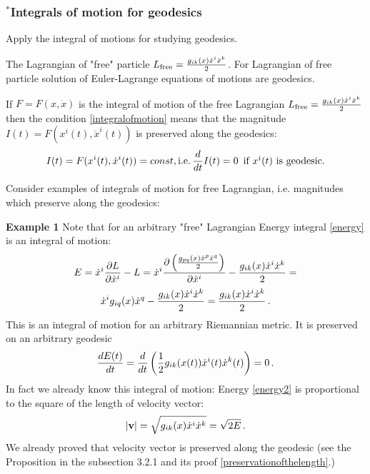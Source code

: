\documentclass[12pt]{article}
\theoremstyle{theorem}
\numberwithin{equation}{section}
\begin{document}
{\subsubsection {$^*$Integrals of motion for geodesics}

Apply the integral of motions for studying geodesics.

The Lagrangian of "free" particle  $L_{\rm free}={g_{ik}(x)\dot x^i\dot x^k\over 2}$.
  For Lagrangian of free particle solution of Euler-Lagrange equations of motions are geodesics.

  If $F=F(x,\dot x)$ is the integral of motion of the free Lagrangian $L_{\rm free}={g_{ik}(x)\dot x^i\dot x^k\over 2}$
  then the condition \eqref{integralofmotion} means that the magnitude
        $I(t)=F(x^i(t), \dot x^i(t))$ is preserved along the geodesics:
                  \begin{equation}\label{integralofmotionforgeodesic}
               I(t)=F(x^i(t), \dot x^i(t))=const, {\rm i.e.}\,
               {d\over dt}I(t)=0\,\,\,\hbox{if $x^i(t)$  is geodesic.}
                 \end{equation}

  Consider examples of integrals of motion for free Lagrangian, i.e. magnitudes which preserve along the geodesics:

  \m

  {\bf Example 1}  Note that for an arbitrary "free" Lagrangian Energy integral \eqref{energy}
   is an integral of motion:
                       $$
      E=\dot x^i {\partial L\over \partial \dot x^i}-L=
      \dot x^i {\partial \left({g_{pq}(x)\dot x^p\dot x^q\over 2}\right)\over \partial \dot x^i}-
      {g_{ik}(x)\dot x^i\dot x^k\over 2}=
                       $$
                    \begin{equation}\label{energy2}
   \dot x^ig_{iq}(x)\dot x^q-{g_{ik}(x)\dot x^i\dot x^k\over 2}={g_{ik}(x)\dot x^i\dot x^k\over 2}\,.
                    \end{equation}
   This is an integral of motion for an arbitrary Riemannian metric. It is preserved on an arbitrary geodesic
                         $$
            {dE(t)\over dt}={d\over dt}\left({1\over 2}
            g_{ik}(x(t))\dot x^i(t)\dot x^k(t)\right)=0\,.
                         $$
   In fact we already know this integral of motion:  Energy \eqref{energy2} is proportional to the
   square of the length of velocity vector:
   \begin{equation}\label{energyandspeed}
   |{\bf v}|=\sqrt {g_{ik}(x)\dot x^i\dot x^k}=\sqrt {2E}\,.
   \end{equation}
   We already proved that velocity vector is preserved
   along the geodesic (see the Proposition in the subsection 3.2.1 and its proof \eqref{preservationofthelength}.)


}
\end{document}
